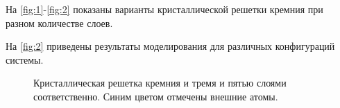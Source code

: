 \documentclass[12pt,a4paper]{article}
\begin{document}
        На \autoref{fig:1}-\autoref{fig:2} показаны варианты кристаллической решетки кремния при разном количестве слоев.

        На \autoref{fig:2} приведены результаты моделирования для различных конфигураций системы.
        \begin{figure}[!htb]%
            \centering
            \hspace{8pt}%
            \hspace{8pt}%
            \caption[]{Кристаллическая решетка кремния и тремя и пятью слоями соответственно. Синим цветом отмечены внешние атомы.}%
            \label{fig:1}%
        \end{figure}
\end{document}
